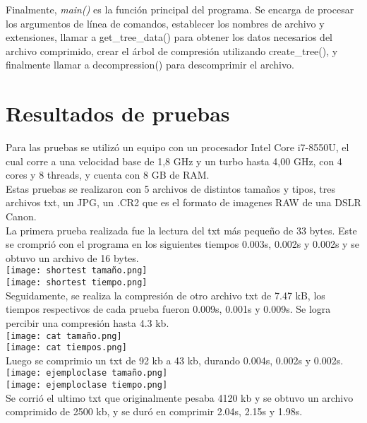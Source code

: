 \documentclass[12pt, article, natbib]{IEEEtran}
\begin{document}
Finalmente, \textit{main()} es la función principal del programa. Se encarga de procesar los argumentos de línea de comandos, establecer los nombres de archivo y extensiones, llamar a get\_tree\_data() para obtener los datos necesarios del archivo comprimido, crear el árbol de compresión utilizando create\_tree(), y finalmente llamar a decompression() para descomprimir el archivo.


\section{Resultados de pruebas}
Para las pruebas se utilizó un equipo con un procesador Intel Core i7-8550U, el cual corre a una velocidad base de 1,8 GHz y un turbo hasta 4,00 GHz, con 4 cores y 8 threads, y cuenta con 8 GB de RAM.\\

Estas pruebas se realizaron con 5 archivos de distintos tamaños y tipos, tres archivos txt, un JPG, un .CR2 que es el formato de imagenes RAW de una DSLR Canon.\\

La primera prueba realizada fue la lectura del txt más pequeño de 33 bytes. Este se cromprió con el programa en los siguientes tiempos 0.003s, 0.002s y 0.002s y se obtuvo un archivo de 16 bytes.\\

\texttt{[image: shortest tamaño.png]}\\
\texttt{[image: shortest tiempo.png]}\\

Seguidamente, se realiza la compresión de otro archivo txt de 7.47 kB, los tiempos respectivos de cada prueba fueron 0.009s, 0.001s y 0.009s. Se logra percibir una compresión hasta 4.3 kb.\\ 

\texttt{[image: cat tamaño.png]}\\
\texttt{[image: cat tiempos.png]}\\

Luego se comprimio un txt de 92 kb a 43 kb, durando 0.004s, 0.002s y 0.002s.\\

\texttt{[image: ejemploclase tamaño.png]}\\
\texttt{[image: ejemploclase tiempo.png]}\\

Se corrió el ultimo txt que originalmente pesaba 4120 kb y se obtuvo un archivo comprimido de 2500 kb, y se duró en comprimir 2.04s, 2.15s y 1.98s.\\
\end{document}
